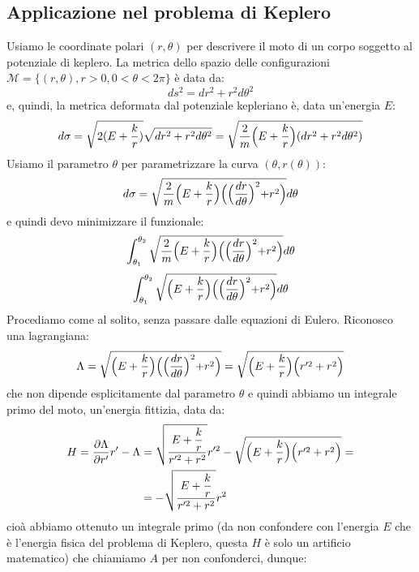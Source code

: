 \documentclass[a4paper,openany]{article}
\begin{document}
	\subsection{Applicazione nel problema di Keplero}
	Usiamo le coordinate polari $(r,\theta)$ per descrivere il moto di un corpo soggetto al potenziale di keplero. La metrica dello spazio delle configurazioni $\mathcal{M} = \{(r,\theta), r>0, 0 <\theta < 2\pi\}$ è data da:
	$$
	ds^2 = dr^2 + r^2d\theta^2
	$$
	e, quindi, la metrica deformata dal potenziale kepleriano è, data un'energia $E$:
	$$
	d\sigma = \sqrt{2(E+\dfrac{k}{r})} \sqrt{dr^2 + r^2d\theta^2} = \sqrt{\dfrac{2}{m}\Bigl(E+\dfrac{k}{r}\Bigl)(dr^2 + r^2d\theta^2)}
	$$
	Usiamo il parametro $\theta$ per parametrizzare la curva $(\theta, r(\theta))$:
	\begin{equation}\label{key}
		d\sigma =  \sqrt{\dfrac{2}{m}\Bigl(E+\dfrac{k}{r}\Bigl)\Bigl(\Bigl(\dfrac{dr}{d\theta}\Bigl)^2 + r^2\Bigl)}d\theta
	\end{equation}
	e quindi devo minimizzare il funzionale:
	\begin{equation}\label{key}
		\int_{\theta_1}^{\theta_2} \sqrt{\dfrac{2}{m}\Bigl(E+\dfrac{k}{r}\Bigl)\Bigl(\Bigl(\dfrac{dr}{d\theta}\Bigl)^2 + r^2\Bigl)}d\theta 
	\end{equation}
	\begin{equation}\label{key}
		\int_{\theta_1}^{\theta_2} \sqrt{\Bigl(E+\dfrac{k}{r}\Bigl)\Bigl(\Bigl(\dfrac{dr}{d\theta}\Bigl)^2 + r^2\Bigl)}d\theta 
	\end{equation}
	Procediamo come al solito, senza passare dalle equazioni di Eulero. Riconosco una lagrangiana:
	\begin{equation}\label{key}
		\Lambda = \sqrt{\Bigl(E+\dfrac{k}{r}\Bigl)\Bigl(\Bigl(\dfrac{dr}{d\theta}\Bigl)^2 + r^2\Bigl)}= \sqrt{\Bigl(E+\dfrac{k}{r}\Bigl)\Bigl(r'^2 + r^2\Bigl)}
	\end{equation}
	che non dipende esplicitamente dal parametro $\theta$ e quindi abbiamo un integrale primo del moto, un'energia fittizia, data da:
	\begin{equation}\label{key}
		\begin{aligned}
			H = \dfrac{\partial\Lambda}{\partial r'}r'-\Lambda &= \sqrt{\dfrac{E+\dfrac{k}{r}}{r'^2+r^2}}r'^2 -  \sqrt{\Bigl(E+\dfrac{k}{r}\Bigl)\Bigl(r'^2 + r^2\Bigl)} = \\
			&= - \sqrt{\dfrac{E+\dfrac{k}{r}}{r'^2+r^2}}r^2
		\end{aligned}
	\end{equation}
	cioà abbiamo ottenuto un integrale primo (da non confondere con l'energia $E$ che è l'energia fisica del problema di Keplero, questa $H$ è solo un artificio matematico) che chiamiamo $A$ per non confonderci, dunque:
\end{document}
